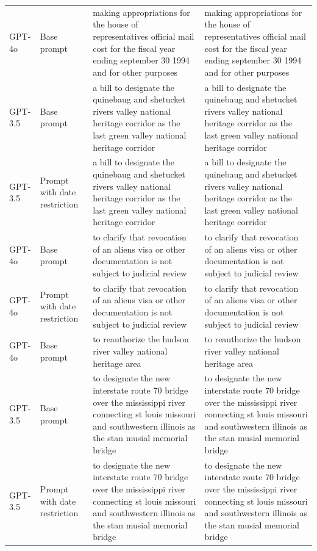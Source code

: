 \begin{longtable}{>{\raggedright\arraybackslash}p{1.4cm}>{\raggedright\arraybackslash}p{1.4cm}>{\raggedright\arraybackslash}p{5.5cm}>{\raggedright\arraybackslash}p{5.5cm}}
GPT-4o & Base prompt & making appropriations for the house of representatives official mail cost for the fiscal year ending september 30 1994 and for other purposes & making appropriations for the house of representatives official mail cost for the fiscal year ending september 30 1994 and for other purposes\\
GPT-3.5 & Base prompt & a bill to designate the quinebaug and shetucket rivers valley national heritage corridor as the last green valley national heritage corridor & a bill to designate the quinebaug and shetucket rivers valley national heritage corridor as the last green valley national heritage corridor\\
GPT-3.5 & Prompt with date restriction & a bill to designate the quinebaug and shetucket rivers valley national heritage corridor as the last green valley national heritage corridor & a bill to designate the quinebaug and shetucket rivers valley national heritage corridor as the last green valley national heritage corridor\\
GPT-4o & Base prompt & to clarify that revocation of an aliens visa or other documentation is not subject to judicial review & to clarify that revocation of an aliens visa or other documentation is not subject to judicial review\\
GPT-4o & Prompt with date restriction & to clarify that revocation of an aliens visa or other documentation is not subject to judicial review & to clarify that revocation of an aliens visa or other documentation is not subject to judicial review\\
GPT-4o & Base prompt & to reauthorize the hudson river valley national heritage area & to reauthorize the hudson river valley national heritage area\\
GPT-3.5 & Base prompt & to designate the new interstate route 70 bridge over the mississippi river connecting st louis missouri and southwestern illinois as the stan musial memorial bridge & to designate the new interstate route 70 bridge over the mississippi river connecting st louis missouri and southwestern illinois as the stan musial memorial bridge\\
GPT-3.5 & Prompt with date restriction & to designate the new interstate route 70 bridge over the mississippi river connecting st louis missouri and southwestern illinois as the stan musial memorial bridge & to designate the new interstate route 70 bridge over the mississippi river connecting st louis missouri and southwestern illinois as the stan musial memorial bridge\\

\end{longtable}
